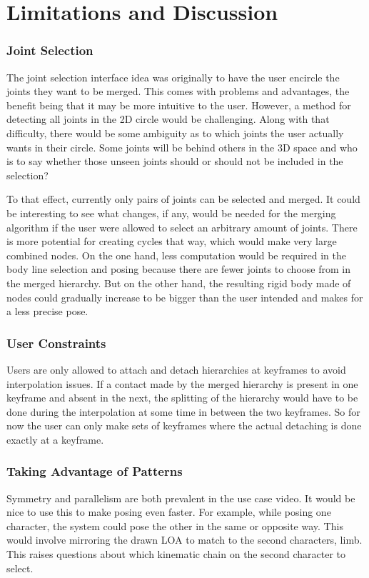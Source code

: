 \chapter{Limitations and Discussion}\label{chap:discussion}

\subsection{Joint Selection}
The joint selection interface idea was originally to have the user encircle the joints they want to be merged. This comes with problems and advantages, the benefit being that it may be more intuitive to the user. However, a method for detecting all joints in the 2D circle would be challenging. Along with that difficulty, there would be some ambiguity as to which joints the user actually wants in their circle. Some joints will be behind others in the 3D space and who is to say whether those unseen joints should or should not be included in the selection?

To that effect, currently only pairs of joints can be selected and merged. It could be interesting to see what changes, if any, would be needed for the merging algorithm if the user were allowed to select an arbitrary amount of joints. There is more potential for creating cycles that way, which would make very large combined nodes. On the one hand, less computation would be required in the body line selection and posing because there are fewer joints to choose from in the merged hierarchy. But on the other hand, the resulting rigid body made of nodes could gradually increase to be bigger than the user intended and makes for a less precise pose.

\subsection{User Constraints}
Users are only allowed to attach and detach hierarchies at keyframes to avoid interpolation issues. If a contact made by the merged hierarchy is present in one keyframe and absent in the next, the splitting of the hierarchy would have to be done during the interpolation at some time in between the two keyframes. So for now the user can only make sets of keyframes where the actual detaching is done exactly at a keyframe.

\subsection{Taking Advantage of Patterns}
Symmetry and parallelism are both prevalent in the use case video. It would be nice to use this to make posing even faster. For example, while posing one character, the system could pose the other in the same or opposite way. This would involve mirroring the drawn LOA to match to the second characters, limb. This raises questions about which kinematic chain on the second character to select. 

